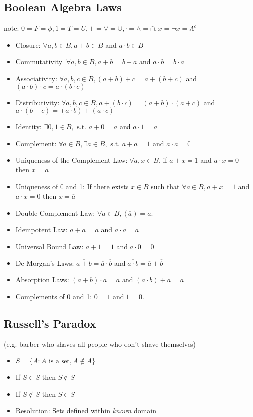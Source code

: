 \documentclass[8pt,landscape]{article}
\begin{document}
\begin{multicols*}{4}
		\subsection*{Boolean Algebra Laws}
		note: $0=F=\phi, 1=T=U, + = \lor = \cup,\cdot=\land=\cap,\overline{x}=\neg x = A^c$
		\begin{itemize}[leftmargin=*]
			\item Closure: $\forall a,b\in B, a + b \in B$ and $a \cdot b \in B$
			\item Commutativity: $\forall a,b\in B, a + b = b + a$ and $a\cdot b=b\cdot a$
			\item Associativity: $\forall a,b,c\in B,(a + b) + c = a + (b + c)$ and $(a\cdot b)\cdot c=a\cdot (b\cdot c)$
			\item Distributivity: $\forall a,b,c\in B,a + (b \cdot c) = (a + b) \cdot (a + c)$ and $a\cdot (b+c)=(a\cdot b)+(a\cdot c)$
			\item Identity: $\exists 0,1 \in B, \text{ s.t. }a + 0 = a$ and $a \cdot 1 = a$
			\item Complement: $\forall a\in B, \exists \overline{a}\in B, \text{ s.t. }a + \overline{a} = 1$ and $a \cdot \overline{a} = 0$
			\item Uniqueness of the Complement Law: $\forall a,x \in B$, if $a+x=1$ and $a\cdot x=0$ then $x=\overline{a}$
			\item Uniqueness of 0 and 1: If there exists $x\in B$ such that $\forall a \in B, a+x=1$ and $a\cdot x=0$ then $x=\overline{a}$
			\item Double Complement Law: $\forall a\in B, \overline{(\overline{a})}=a.$
			\item Idempotent Law: $a+a=a$ and $a\cdot a=a$
			\item Universal Bound Law: $a+1=1$ and $a\cdot 0=0$
			\item De Morgan's Laws: $\overline{a+b}=\overline{a}\cdot\overline{b}$ and $\overline{a\cdot b}=\overline{a}+\overline{b}$
			\item Absorption Laws: $(a+b)\cdot a=a$ and $(a\cdot b)+a=a$
			\item Complements of 0 and 1: $\overline{0}=1$ and $\overline{1}=0$.
		\end{itemize}
		
		\subsection*{Russell's Paradox}
		 (e.g. barber who shaves all people who don't shave themselves)
		\begin{itemize}[leftmargin=*]
			\item $S = \{A : A \text{ is a set}, A \notin A\}$
			\item If $S \in S$ then $S \notin S$
			\item If $S \notin S$ then $S \in S$
			\item Resolution: Sets defined within \textit{known} domain
		\end{itemize}
		

\end{multicols*}
\end{document}
